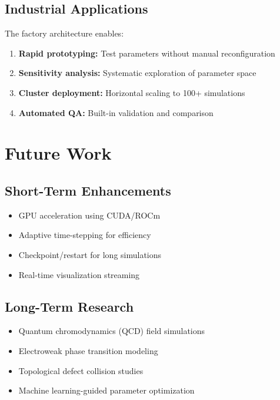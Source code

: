 \documentclass[12pt,a4paper]{article}
\begin{document}
\subsection{Industrial Applications}

The factory architecture enables:

\begin{enumerate}
    \item \textbf{Rapid prototyping:} Test parameters without manual reconfiguration
    \item \textbf{Sensitivity analysis:} Systematic exploration of parameter space
    \item \textbf{Cluster deployment:} Horizontal scaling to 100+ simulations
    \item \textbf{Automated QA:} Built-in validation and comparison
\end{enumerate}

\section{Future Work}

\subsection{Short-Term Enhancements}

\begin{itemize}
    \item GPU acceleration using CUDA/ROCm
    \item Adaptive time-stepping for efficiency
    \item Checkpoint/restart for long simulations
    \item Real-time visualization streaming
\end{itemize}

\subsection{Long-Term Research}

\begin{itemize}
    \item Quantum chromodynamics (QCD) field simulations
    \item Electroweak phase transition modeling
    \item Topological defect collision studies
    \item Machine learning-guided parameter optimization
\end{itemize}
\end{document}
